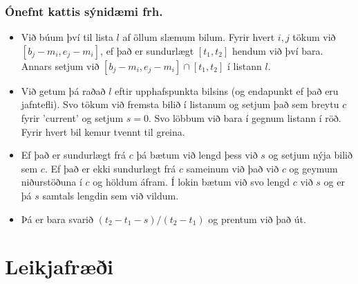 \documentclass{beamer}
\begin{document}
\begin{frame}
\frametitle{Ónefnt kattis sýnidæmi frh.}

\begin{itemize}

\item<1-> Við búum því til lista $l$ af öllum slæmum bilum. Fyrir hvert $i, j$ tökum við $[b_j - m_i, e_j - m_i]$, ef það er sundurlægt $[t_1, t_2]$ hendum við því bara. Annars setjum við $[b_j - m_i, e_j - m_i] \cap [t_1, t_2]$ í listann $l$.

\item<2-> Við getum þá raðað $l$ eftir upphafspunkta bilsins (og endapunkt ef það eru jafntefli). Svo tökum við fremsta bilið í listanum og setjum það sem breytu $c$ fyrir 'current' og setjum $s = 0$. Svo löbbum við bara í gegnum listann í röð. Fyrir hvert bil kemur tvennt til greina.

\item<3-> Ef það er sundurlægt frá $c$ þá bætum við lengd þess við $s$ og setjum nýja bilið sem $c$. Ef það er ekki sundurlægt frá $c$ sameinum við það við $c$ og geymum niðurstöðuna í $c$ og höldum áfram. Í lokin bætum við svo lengd $c$ við $s$ og er þá $s$ samtals lengdin sem við vildum.

\item<4-> Þá er bara svarið $(t_2 - t_1 - s) / (t_2 - t_1)$ og prentum við það út.

\end{itemize}

\end{frame}

\section[Leikjafræði]{Leikjafræði}
\end{document}
